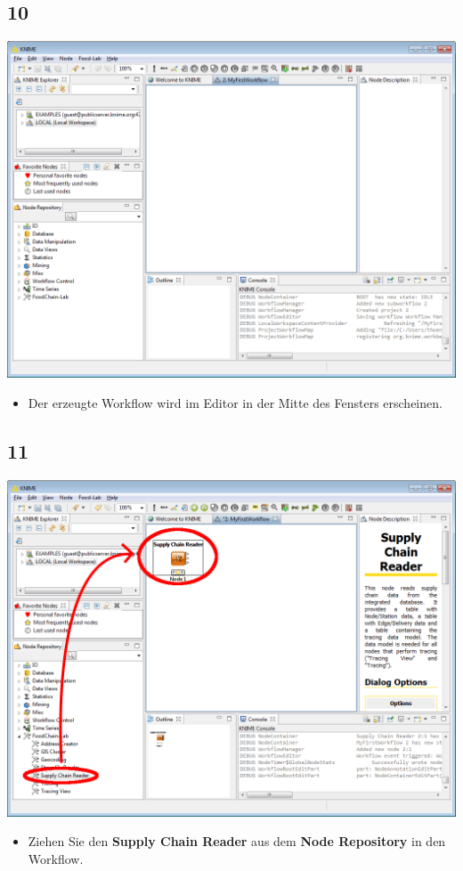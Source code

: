 \documentclass{beamer}
\begin{document}
\subsection{10}
\begin{frame}
	\begin{center}
  		\includegraphics[height=0.6\textheight]{10.png}
	\end{center}
	\begin{itemize}
		\item Der erzeugte Workflow wird im Editor in der Mitte des Fensters erscheinen.
	\end{itemize}
\end{frame}

\subsection{11}
\begin{frame}
	\begin{center}
  		\includegraphics[height=0.6\textheight]{11.png}
	\end{center}
	\begin{itemize}
		\item Ziehen Sie den \textbf{Supply Chain Reader} aus dem \textbf{Node Repository} in den Workflow.
	\end{itemize}
\end{frame}
\end{document}

